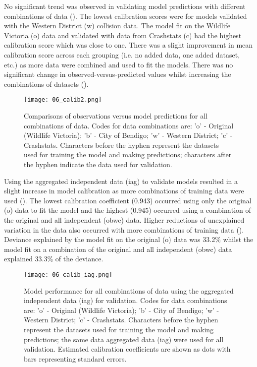 No significant trend was observed in validating model predictions with different combinations of data (). The lowest calibration scores were for models validated with the Western District (w) collision data. The model fit on the Wildlife Victoria (o) data and validated with data from Crashstats (c) had the highest calibration score which was close to one. There was a slight improvement in mean calibration score across each grouping (i.e. no added data, one added dataset, etc.) as more data were combined and used to fit the models. There was no significant change in observed-versus-predicted values whilst increasing the combinations of datasets ().

\begin{figure*}[htp]
  \centering
  \texttt{[image: 06\_calib2.png]}
  \caption[Comparisons of observations versus model predictions for all combinations of original and independent data]{Comparisons of observations versus model predictions for all combinations of data. Codes for data combinations are: 'o' - Original (Wildlife Victoria); 'b' - City of Bendigo; 'w' - Western District; 'c' - Crashstats. Characters before the hyphen represent the datasets used for training the model and making predictions; characters after the hyphen indicate the data used for validation.}
  \label{val_calib2}
\end{figure*}

Using the aggregated independent data (iag) to validate models resulted in a slight increase in model calibration as more combinations of training data were used ().  The lowest calibration coefficient (0.943) occurred using only the original (o) data to fit the model and the highest (0.945) occurred using a combination of the original and all independent (obwc) data. Higher reductions of unexplained variation in the data also occurred with more combinations of training data (). Deviance explained by the model fit on the original (o) data was 33.2\% whilst the model fit on a combination of the original and all independent (obwc) data explained 33.3\% of the deviance.

\begin{figure*}[htp]
  \centering
  \texttt{[image: 06\_calib\_iag.png]}
  \caption[Model calibration for all combinations of training data using the aggregated independent data for validation]{Model performance for all combinations of data using the aggregated independent data (iag) for validation. Codes for data combinations are: 'o' - Original (Wildlife Victoria); 'b' - City of Bendigo; 'w' - Western District; 'c' - Crashstats. Characters before the hyphen represent the datasets used for training the model and making predictions; the same data aggregated data (iag) were used for all validation. Estimated calibration coefficients are shown as dots with bars representing standard errors.}
  \label{val_calib_iag}
\end{figure*}

